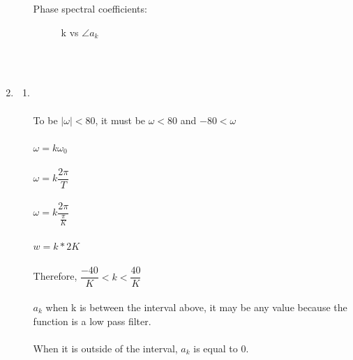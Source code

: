 \documentclass[10pt,a4paper, margin=1in]{article}
\begin{document}
\begin{enumerate}
\begin{enumerate}
    Phase spectral coefficients:   
    \begin{figure} [H]
        \centering
        \caption{k vs $\angle a_k$}
        \label{fig:q6b_2.dat}
    \end{figure}
    \end{enumerate}    
    \\\\
\item %
    \begin{enumerate}
    \item %
    \\\\ To be $|\omega| < 80$, it must be $\omega < 80$ and $-80 < \omega$
    \\\\ $\omega = k\omega_{0}$ 
    \\\\$\omega = k \dfrac{2\pi}{T}$
    \\\\ $\omega = k \dfrac{2\pi}{\frac{\pi}{K}}$
    \\\\ $w = k * 2K$
    \\\\Therefore, $\dfrac{-40}{K}<k<\dfrac{40}{K}$
    \\\\ $a_{k}$ when k is between the interval above, it may be any value because the function is a low pass filter.
    \\\\ When it is outside of the interval, $a_{k}$ is equal to 0.
    \\\\

\end{enumerate}
\end{enumerate}
\end{document}
